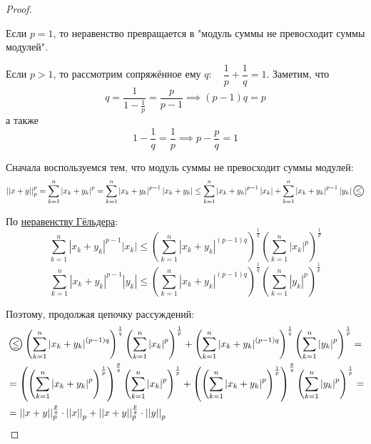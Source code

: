 \documentclass[../main.tex]{subfiles}
\begin{document}
\begin{proof}

    ~

    Если \( p=1\), то неравенство превращается в "модуль суммы не превосходит суммы модулей". 

    Если \( p > 1\), то рассмотрим сопряжённое ему \( q:\quad \dfrac{ 1}{ p} + \dfrac{ 1}{ q} =1\). Заметим, что
    \[ q = \dfrac{ 1}{ 1- \frac{ 1}{ p} }= \dfrac{ p}{ p-1} \implies \left( p-1\right)q=p \]
    а также
    \[ 1- \dfrac{ 1}{ q} = \dfrac{ 1}{ p}  \implies p- \dfrac{ p}{ q} =1 \]

    Сначала воспользуемся тем, что модуль суммы не превосходит суммы модулей:
    \[ \left| \left| x+y\right|\right|_p^p= \sum\limits_{ k=1}^{ n} \left| x_k+y_k\right|^p= \sum\limits_{ k=1}^{ n} \left| x_k+y_k\right|^{p-1}\left| x_k+y_k\right| \leq \sum\limits_{ k=1}^{ n} \left| x_k+y_k\right|^{p-1}\left| x_k\right|+ \sum\limits_{ k=1}^{ n} \left| x_k+y_k\right|^{p-1}\left| y_k\right| \oleq\]

    По \hyperlink{thm:Gelder}{неравенству Гёльдера}:
    \[ \sum\limits_{ k=1}^{ n} \left| x_k+y_k\right|^{p-1}\left| x_k\right| \leq \left( \sum\limits_{ k=1}^{ n} \left| x_k+y_k\right|^{(p-1)q}\right)^ \frac{ 1}{ q} \left( \sum\limits_{ k=1}^{ n} \left| x_k\right|^p\right)^ \frac{ 1}{ p} \]
    \[ \sum\limits_{ k=1}^{ n} \left| x_k+y_k\right|^{p-1}\left| y_k\right| \leq \left( \sum\limits_{ k=1}^{ n} \left| x_k+y_k\right|^{(p-1)q}\right)^ \frac{ 1}{ q} \left( \sum\limits_{ k=1}^{ n} \left| y_k\right|^p\right)^ \frac{ 1}{ p} \]

    Поэтому, продолжая цепочку рассуждений:
    \begin{equation*}
        \begin{aligned}
            &\oleq \left( \sum\limits_{ k=1}^{ n} \left| x_k+y_k\right|^{(p-1)q}\right)^ \frac{ 1}{ q} \left( \sum\limits_{ k=1}^{ n} \left| x_k\right|^p\right)^ \frac{ 1}{ p} + \left( \sum\limits_{ k=1}^{ n} \left| x_k+y_k\right|^{(p-1)q}\right)^ \frac{ 1}{ q} \left( \sum\limits_{ k=1}^{ n} \left| y_k\right|^p\right)^ \frac{ 1}{ p} = \\
            &=\left(\left( \sum\limits_{ k=1}^{ n} \left| x_k+y_k\right|^p\right)^ \frac{ 1}{ p}\right)^ \frac{ p}{ q} \left( \sum\limits_{ k=1}^{ n} \left| x_k\right|^p\right)^ \frac{ 1}{ p} + \left(\left( \sum\limits_{ k=1}^{ n} \left| x_k+y_k\right|^p\right)^ \frac{ 1}{ p}\right)^ \frac{ p}{ q} \left( \sum\limits_{ k=1}^{ n} \left| y_k\right|^p\right)^ \frac{ 1}{ p} =\\
            &=\left| \left| x+y\right|\right|_p^ \frac{ p}{ q} \cdot \left| \left| x\right|\right|_p+ \left| \left| x+y\right|\right|_p^ \frac{ p}{ q} \cdot \left| \left| y\right|\right|_p
        \end{aligned}
    \end{equation*}


\end{proof}
\end{document}
